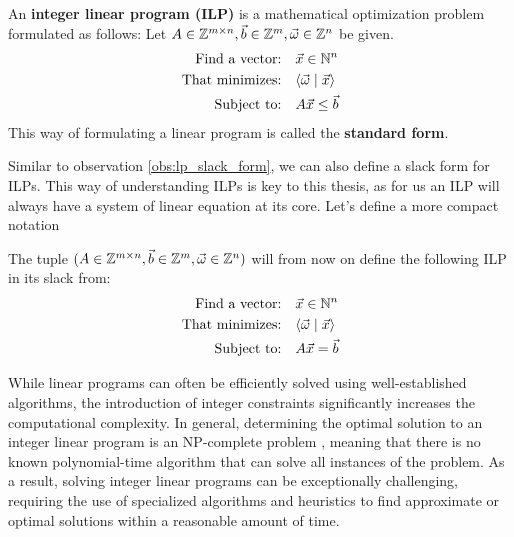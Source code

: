 \begin{definition}
    An \textbf{integer linear program (ILP)} is a mathematical optimization problem formulated as follows: Let $A\in\mathbb{Z}^{m\times n}, \vec b \in \mathbb{Z}^m, \vec\omega \in \mathbb{Z}^n$ be given.
    \begin{align*}
        \text{Find a vector:} & \quad \vec x \in \mathbb{N}^n \\
        \text{That minimizes:} & \quad \langle \vec \omega \mid \vec x \rangle\\
        \text{Subject to:} & \quad A\vec x \leq \vec b \\
    \end{align*}
    This way of formulating a linear program is called the \textbf{standard form}.
\end{definition}
\begin{observation}
    Similar to observation \ref{obs:lp_slack_form}, we can also define a slack form for ILPs. This way of understanding ILPs is key to this thesis, as for us an ILP will always have a system of linear equation at its core. Let's define a more compact notation
\end{observation}

\begin{definition}
    The tuple $(A\in\mathbb{Z}^{m\times n}, \vec b \in \mathbb{Z}^m, \vec\omega \in \mathbb{Z}^n)$ will from now on define the following ILP in its slack from:
    \begin{align*}
        \text{Find a vector:} & \quad \vec x \in \mathbb{N}^n \\
        \text{That minimizes:} & \quad \langle \vec \omega \mid \vec x \rangle\\
        \text{Subject to:} & \quad A\vec x = \vec b \\
    \end{align*}
\end{definition}

While linear programs can often be efficiently solved using well-established algorithms, the introduction of integer constraints significantly increases the computational complexity. In general, determining the optimal solution to an integer linear program is an NP-complete problem \citeyearpar{wiki:integer_programming}, meaning that there is no known polynomial-time algorithm that can solve all instances of the problem. As a result, solving integer linear programs can be exceptionally challenging, requiring the use of specialized algorithms and heuristics to find approximate or optimal solutions within a reasonable amount of time. 